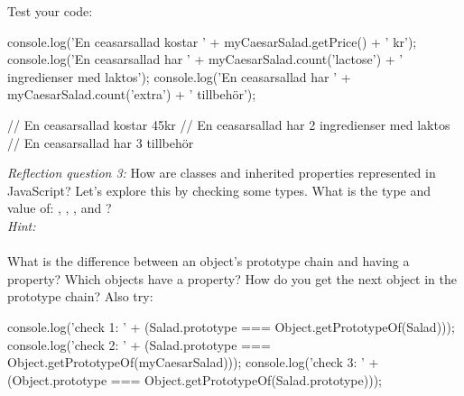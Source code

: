 \documentclass[fleqn, article, a4paper]{memoir}
\begin{document}
\begin{Assignments}
\noindent Test your code:
\begin{Code}
console.log('En ceasarsallad kostar ' + myCaesarSalad.getPrice() + ' kr');
console.log('En ceasarsallad har ' + myCaesarSalad.count('lactose') + 
            ' ingredienser med laktos');
console.log('En ceasarsallad har ' + myCaesarSalad.count('extra') + ' tillbehör');

// En ceasarsallad kostar 45kr
// En ceasarsallad har 2 ingredienser med laktos
// En ceasarsallad har 3 tillbehör
\end{Code}
\emph{Reflection question 3:} How are classes and inherited properties represented in JavaScript? Let's explore this by checking some types. What is the type and value of: , , ,  and ?
\\ \emph{Hint:} 
\\\\
What is the difference between an object's prototype chain and having a  property? Which objects have a  property? How do you get the next object in the prototype chain? Also try:
\begin{Code}
console.log('check 1: ' + 
  (Salad.prototype === Object.getPrototypeOf(Salad)));
console.log('check 2: ' + 
  (Salad.prototype === Object.getPrototypeOf(myCaesarSalad)));
console.log('check 3: ' + 
  (Object.prototype === Object.getPrototypeOf(Salad.prototype)));
 \end{Code}


\end{Assignments}
\end{document}
